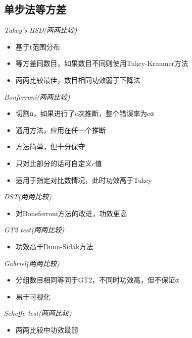 \documentclass[]{tufte-book}
\providecommand{\tightlist}{%
  \setlength{\itemsep}{0pt}\setlength{\parskip}{0pt}}
\begin{document}
\hypertarget{ux5355ux6b65ux6cd5ux7b49ux65b9ux5dee}{%
\subsection{单步法等方差}\label{ux5355ux6b65ux6cd5ux7b49ux65b9ux5dee}}

\emph{Tukey's HSD(两两比较)}

\begin{itemize}
\tightlist
\item
  基于t范围分布
\item
  等方差同数目，如果数目不同则使用Tukey-Kranmer方法
\item
  两两比较最佳，数目相同功效弱于下降法
\end{itemize}

\emph{Bonferroni(两两比较)}

\begin{itemize}
\tightlist
\item
  切割α，如果进行了c次推断，整个错误率为cα
\item
  通用方法，应用在任一个推断
\item
  方法简单，但十分保守
\item
  只对比部分的话可自定义c值
\item
  适用于指定对比数情况，此时功效高于Tukey
\end{itemize}

\emph{DST(两两比较)}

\begin{itemize}
\tightlist
\item
  对Boneferroni方法的改进，功效更高
\end{itemize}

\emph{GT2 test(两两比较)}

\begin{itemize}
\tightlist
\item
  功效高于Dunn-Sidak方法
\end{itemize}

\emph{Gabriel(两两比较)}

\begin{itemize}
\tightlist
\item
  分组数目相同等同于GT2，不同时功效高，但不保证α
\item
  易于可视化
\end{itemize}

\emph{Scheffe test(两两比较)}

\begin{itemize}
\tightlist
\item
  两两比较中功效最弱
\end{itemize}
\end{document}
